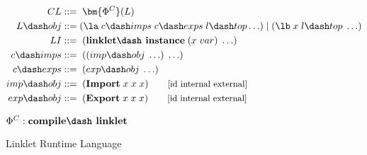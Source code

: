 \begin{figure}[!htbp]
    \centering
    \small
    \begin{align*}
    CL             &::=\; \bm{\Phi^C}(L)\\
    L\dash obj     &::= (\la\; c\dash imps \; c\dash exps \; l\dash top \ldots) \;|\; (\lb\; x\; l\dash top\; \ldots)\\
    LI             &::=\; (\textbf{linklet\dash instance}\; (x\; var)\; \ldots) \\
    c\dash imps    &::=\; ((imp\dash obj\; \ldots)\; \ldots)\\
    c\dash exps    &::=\; (exp\dash obj\; \ldots)\\
    imp\dash obj   &::=\; (\textbf{Import}\; x\; x\; x) \qquad\text{\small[id internal external]} \\
    exp\dash obj   &::=\; (\textbf{Export}\; x\; x\; x) \qquad\text{\small[id internal external]} \\
	\end{align*}

    \vspace{-1em}

    \footnotesize $\Phi^C : \textbf{compile\dash linklet}$
    \caption{Linklet Runtime Language}
    \label{fig:linklet-runtime-language}
\end{figure}